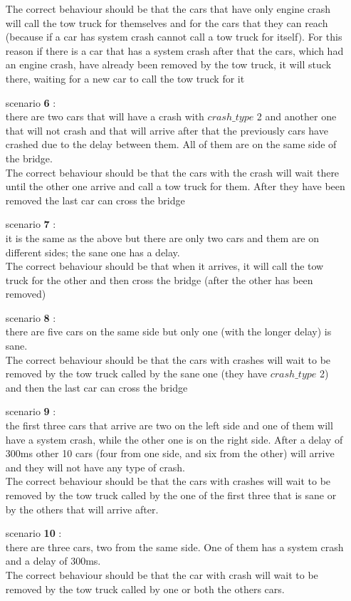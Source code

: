 \begin{itemize}
    The correct behaviour should be that the cars that have only engine crash will call the tow truck for themselves and
    for the cars that they can reach (because if a car has system crash cannot call a tow truck for itself). 
    For this reason if there is a car that has a system crash after that the cars, which had an engine crash, 
    have already been removed by the tow truck, it will stuck there, waiting for a new car to call the tow truck for it
    \item[scenario \textbf{6}]: \\ there are two cars that will have a crash with $crash\_type$ 2 and another one that will not
    crash and that will arrive after that the previously cars have crashed due to the delay between them. All of them are on the same 
    side of the bridge. \\ The correct behaviour should be that the cars with 
    the crash will wait there until the other one arrive and call a tow truck for them. After they have been removed
    the last car can cross the bridge 
    \item[scenario \textbf{7}]: \\ it is the same as the above but there are only two cars and them are on different sides; the 
    sane one has a delay. \\ The correct behaviour should be that when it arrives, it will call the tow truck for
    the other and then cross the bridge (after the other has been removed) 
    \item[scenario \textbf{8}]: \\ there are five cars on the same side but only one (with the longer delay) is sane. \\
    The correct behaviour should be that the cars with crashes will wait to be removed by the tow truck called 
    by the sane one (they have $crash\_type$ 2) and then the last car can cross the bridge 
    \item[scenario \textbf{9}]: \\ the first three cars that arrive are two on the left side and one of them will
    have a system crash, while the other one is on the right side. After a delay of 300ms other 10 cars (four from one side, and six from the other)
    will arrive and they will not have any type of crash. \\
    The correct behaviour should be that the cars with crashes will wait to be removed by the tow truck called by
    the one of the first three that is sane or by the others that will arrive after.    
    \item[scenario \textbf{10}]: \\ there are three cars, two from the same side. One of them has a system crash 
    and a delay of 300ms. \\
    The correct behaviour should be that the car with crash will wait to be removed by the tow truck called by
    one or both the others cars.
    
    
\end{itemize}